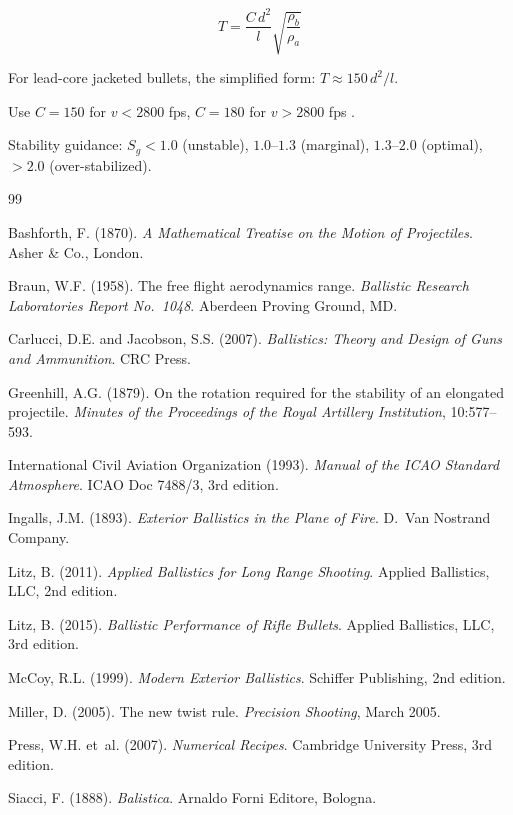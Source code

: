 \documentclass[11pt,twoside,openright]{report}
\begin{document}
\begin{equation}
  \boxed{T = \frac{C\,d^2}{l} \sqrt{\frac{\rho_b}{\rho_a}}}
  \label{eq:greenhill}
\end{equation}

For lead-core jacketed bullets, the simplified form:
$T \approx 150\,d^2/l$.

Use $C = 150$ for $v < 2800$ fps, $C = 180$ for $v > 2800$ fps \citep{greenhill1879rotation}.

Stability guidance: $S_g < 1.0$ (unstable), $1.0$--$1.3$ (marginal), $1.3$--$2.0$ (optimal), $> 2.0$ (over-stabilized).


\begin{thebibliography}{99}

Bashforth, F. (1870). \emph{A Mathematical Treatise on the Motion of Projectiles}. Asher \& Co., London.

Braun, W.F. (1958). The free flight aerodynamics range. \emph{Ballistic Research Laboratories Report No.\ 1048}. Aberdeen Proving Ground, MD.

Carlucci, D.E. and Jacobson, S.S. (2007). \emph{Ballistics: Theory and Design of Guns and Ammunition}. CRC Press.

Greenhill, A.G. (1879). On the rotation required for the stability of an elongated projectile. \emph{Minutes of the Proceedings of the Royal Artillery Institution}, 10:577--593.

International Civil Aviation Organization (1993). \emph{Manual of the ICAO Standard Atmosphere}. ICAO Doc 7488/3, 3rd edition.

Ingalls, J.M. (1893). \emph{Exterior Ballistics in the Plane of Fire}. D.\ Van Nostrand Company.

Litz, B. (2011). \emph{Applied Ballistics for Long Range Shooting}. Applied Ballistics, LLC, 2nd edition.

Litz, B. (2015). \emph{Ballistic Performance of Rifle Bullets}. Applied Ballistics, LLC, 3rd edition.

McCoy, R.L. (1999). \emph{Modern Exterior Ballistics}. Schiffer Publishing, 2nd edition.

Miller, D. (2005). The new twist rule. \emph{Precision Shooting}, March 2005.

Press, W.H. et~al. (2007). \emph{Numerical Recipes}. Cambridge University Press, 3rd edition.

Siacci, F. (1888). \emph{Balistica}. Arnaldo Forni Editore, Bologna.

\end{thebibliography}
\end{document}
